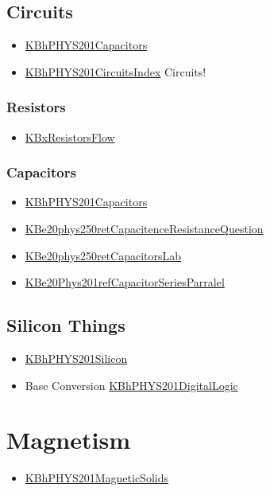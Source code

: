 \documentclass[letterpaper]{article}
\begin{document}
\subsection{Circuits}
\label{sec:org173ce65}
\begin{itemize}
\item \href{KBhPHYS201Capacitors.org}{KBhPHYS201Capacitors}
\item \href{KBhPHYS201CircuitsIndex.org}{KBhPHYS201CircuitsIndex}
Circuits!
\end{itemize}

\subsubsection{Resistors}
\label{sec:orgf72322f}
\begin{itemize}
\item \href{KBxResistorsFlow.org}{KBxResistorsFlow}
\end{itemize}

\subsubsection{Capacitors}
\label{sec:orgdf58f76}
\begin{itemize}
\item \href{KBhPHYS201Capacitors.org}{KBhPHYS201Capacitors}
\item \href{KBe20phys250retCapacitenceResistanceQuestion.org}{KBe20phys250retCapacitenceResistanceQuestion}
\item \href{KBe20phys250retCapacitorsLab.org}{KBe20phys250retCapacitorsLab}
\item \href{KBe20Phys201refCapacitorSeriesParralel.org}{KBe20Phys201refCapacitorSeriesParralel}
\end{itemize}

\subsection{Silicon Things}
\label{sec:org876d253}
\begin{itemize}
\item \href{KBhPHYS201Silicon.org}{KBhPHYS201Silicon}
\item Base Conversion
\href{KBhPHYS201DigitalLogic.org}{KBhPHYS201DigitalLogic}
\end{itemize}

\section{Magnetism}
\label{sec:org0568cf3}
\begin{itemize}
\item \href{KBhPHYS201MagneticSolids.org}{KBhPHYS201MagneticSolids}
\end{itemize}
\end{document}

